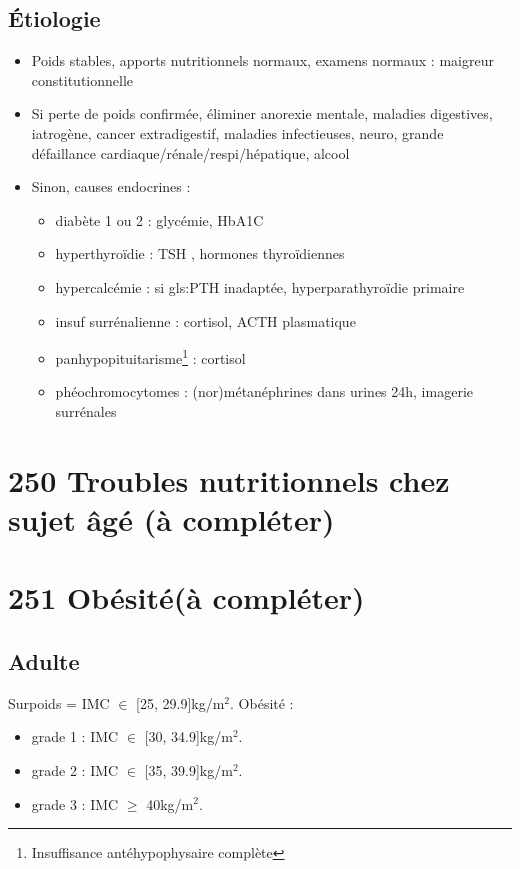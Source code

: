 \documentclass{book}
\begin{document}
\subsection{Étiologie}
\label{sec:org24c0ec0}
\begin{itemize}
\item Poids stables, apports nutritionnels normaux, examens normaux :  maigreur
constitutionnelle
\item Si perte de poids confirmée, éliminer anorexie mentale, maladies digestives,
iatrogène, cancer extradigestif, maladies infectieuses, neuro, grande
défaillance cardiaque/rénale/respi/hépatique, alcool
\item Sinon, causes endocrines :
\begin{itemize}
\item diabète 1 ou 2 : glycémie, HbA1C
\item hyperthyroïdie : TSH \dec\dec, hormones thyroïdiennes \inc
\item hypercalcémie : si gls:PTH inadaptée, hyperparathyroïdie primaire
\item insuf surrénalienne : cortisol, ACTH plasmatique
\item panhypopituitarisme\footnote{Insuffisance antéhypophysaire complète} : cortisol \dec
\item phéochromocytomes : (nor)métanéphrines dans urines 24h, imagerie surrénales
\end{itemize}
\end{itemize}
\section{250 \textdagger{} Troubles nutritionnels chez sujet âgé (à compléter)}
\label{sec:org724921f}
\section{251 \textdagger{} Obésité(à compléter)}
\label{sec:orge80c4a8}
\subsection{Adulte}
\label{sec:orgde9af58}
Surpoids = IMC \(\in\) [25, 29.9]kg/m\(^{\text{2}}\). Obésité :
\begin{itemize}
\item grade 1 : IMC \(\in\) [30, 34.9]kg/m\(^{\text{2}}\).
\item grade 2 : IMC \(\in\) [35, 39.9]kg/m\(^{\text{2}}\).
\item grade 3 : IMC \(\ge\) 40kg/m\(^{\text{2}}\).
\end{itemize}
\end{document}

